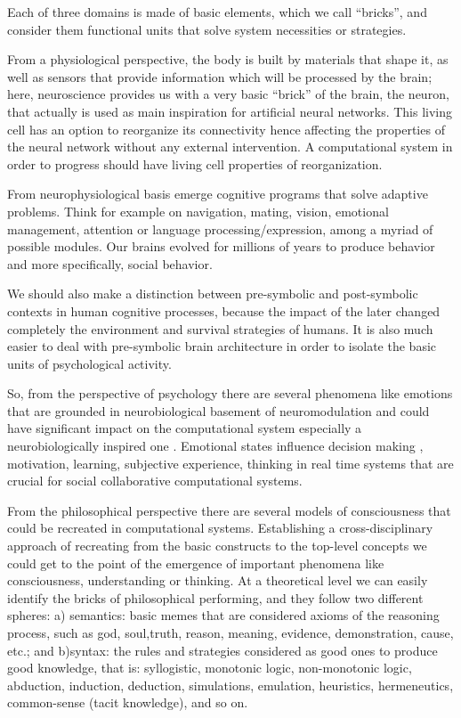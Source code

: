 Each of three domains is made of basic elements, which we call
``bricks'', and consider them functional units that solve system
necessities or strategies.

From a physiological perspective, the body is built by materials that
shape it, as well as sensors that provide information which will be
processed by the brain; here, neuroscience provides us with a very basic
``brick'' of the brain, the neuron, that actually is used as main
inspiration for artificial neural networks. This living cell has an
option to reorganize its connectivity hence affecting the properties of
the neural network without any external intervention. A computational
system in order to progress should have living cell properties of
reorganization.

From neurophysiological basis emerge cognitive programs that solve
adaptive problems\cite{cosmides}. Think for example on navigation,
mating, vision, emotional management, attention or language
processing/expression, among a myriad of possible modules. Our brains
evolved for millions of years to produce behavior and more specifically,
social behavior.

We should also make a distinction between pre-symbolic and post-symbolic
contexts in human cognitive processes, because the impact of the later
changed completely the environment and survival strategies of humans. It
is also much easier to deal with pre-symbolic brain architecture in
order to isolate the basic units of psychological activity.

So, from the perspective of psychology \cite{primer_affect_psychology,
tomkins} there are several phenomena like emotions that are grounded
in neurobiological basement of neuromodulation \cite{duchaine,
natureofemotions, cubeofemotions} and could have significant impact on
the computational system especially a neurobiologically inspired one
\cite{affective_computing_book,computational_emotional_thinking,computationalmodelsemotion}.
Emotional states influence decision making \cite{paulus2012},
motivation, learning, subjective experience, thinking
\cite{whatdoesitmeanforcomputer} in real time systems that are crucial
for social collaborative computational systems.

From the philosophical perspective \cite{emotionmachine} there are
several models of consciousness that could be recreated in computational
systems. Establishing a cross-disciplinary approach of recreating from
the basic constructs to the top-level concepts we could get to the point
of the emergence of important phenomena like consciousness,
understanding or thinking. At a theoretical level we can easily identify
the bricks of philosophical performing, and they follow two different
spheres: a) semantics: basic memes that are considered axioms of the
reasoning process, such as god, soul,truth, reason, meaning, evidence,
demonstration, cause, etc.; and b)syntax: the rules and strategies
considered as good ones to produce good knowledge, that is: syllogistic,
monotonic logic, non-monotonic logic, abduction, induction, deduction,
simulations, emulation, heuristics, hermeneutics, common-sense (tacit
knowledge), and so on.

